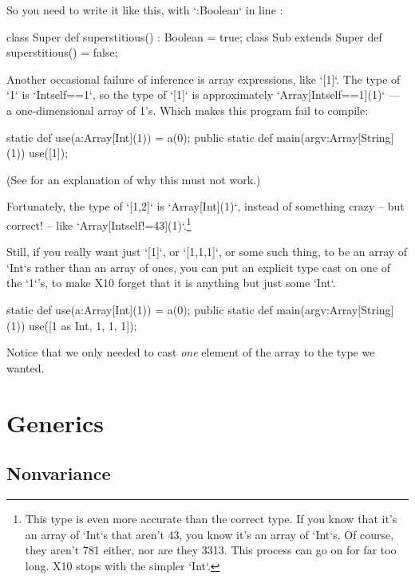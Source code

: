 So you need to write it like this, with \xcd`:Boolean` in line
: 
\begin{xtennum}[]
 class Super {
  def superstitious() : Boolean = true;
}
 class Sub extends Super {
  def superstitious() = false;
}
\end{xtennum}

Another occasional failure of inference is array expressions, like 
\xcd`[1]`.  The type of \xcd`1` is \xcd`Int{self==1}`, 
so the type of \xcd`[1]` is approximately 
\xcd`Array[Int{self==1}](1)` --- a one-dimensional array of 1's.  
Which makes this program fail to compile: 
\begin{xten}
static def use(a:Array[Int](1)) = a(0);
public static def main(argv:Array[String](1)) {
  use([1]);
}
\end{xten}
(See  for an explanation of why 
this must not work.)

Fortunately, the type of \xcd`[1,2]` is \xcd`Array[Int](1)`, instead of
something crazy -- but correct! -- like
\xcd`Array[Int{self!=43}](1)`.\footnote{This type is even more accurate than
the correct type.  If you know that it's an array of \xcd`Int`s that aren't
43, you know it's an array of \xcd`Int`s.  Of course, they aren't 781 either,
nor are they 3313. This process can go on for far too long.  X10 stops with
the simpler \xcd`Int`.}

Still, if you really want just \xcd`[1]`, or \xcd`[1,1,1]`, or some such
thing, to be an array of \xcd`Int`s rather than an array of ones, you can
put an explicit type cast on one of the \xcd`1`'s, to make X10 forget that it
is anything but just some \xcd`Int`.  
\begin{xtennum}[]
static def use(a:Array[Int](1)) = a(0);
public static def main(argv:Array[String](1)) {
  use([1 as Int, 1, 1, 1]);
}
\end{xtennum}
Notice that we only needed to cast {\em one} element of the array to the type
we wanted.  


\section{Generics}

\subsection{Nonvariance}
\label{sect:ArrayNonvariance}


